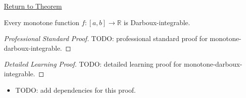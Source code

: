 \newpage
{}
\label{prf:monotone-darboux-integrable}
\begin{remark*}[Return]\hyperref[thm:monotone-darboux-integrable]{Return to Theorem}\end{remark*}

\begin{theorem*}
Every monotone function \(f:[a,b]\to\mathbb R\) is Darboux-integrable.
\end{theorem*}

\begin{proof}[Professional Standard Proof]
\LRAProofBodyStart
TODO: professional standard proof for monotone-darboux-integrable.
\end{proof}

\begin{proof}[Detailed Learning Proof]
\LRAProofBodyStart
TODO: detailed learning proof for monotone-darboux-integrable.
\end{proof}

\begin{remark*}
\end{remark*}

\begin{dependencies}
\begin{itemize}
  \item TODO: add dependencies for this proof.
\end{itemize}
\end{dependencies}

\clearpage
